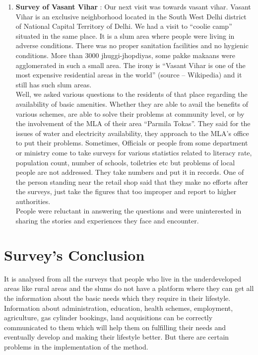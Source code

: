 \begin{enumerate}
\item \textbf{Survey of Vasant Vihar} : Our next visit was towards vasant vihar. Vasant Vihar is an exclusive neighborhood located in the South West Delhi district of National Capital Territory
of Delhi. We had a visit to “coolie camp” situated in the same place. It is a slum area
where people were living in adverse conditions. There was no proper sanitation
facilities and no hygienic conditions. More than 3000 jhuggi-jhopdiyas, some pakke
makaans were agglomerated in such a small area. The irony is “Vasant Vihar is one
of the most expensive residential areas in the world” (source – Wikipedia) and it
still has such slum areas.
\ \\
Well, we asked various questions to the residents of that place regarding the
availability of basic amenities. Whether they are able to avail the benefits of various
schemes, are able to solve their problems at community level, or by the involvement
of the MLA of their area “Parmila Tokas”. They said for the issues of water and
electricity availability, they approach to the MLA’s office to put their problems.
Sometimes, Officials or people from some department or ministry come to take
surveys for various statistics related to literacy rate, population count, number of
schools, toiletries etc but problems of local people are not addressed. They take
numbers and put it in records. One of the person standing near the retail shop said
that they make no efforts after the surveys, just take the figures that too improper
and report to higher authorities.
\ \\
People were reluctant in answering the questions and were uninterested in sharing
the stories and experiences they face and encounter.
\end{enumerate}

\newpage
\section{Survey's Conclusion}
It is analysed from all the surveys that people who live in the underdeveloped areas
like rural areas and the slums do not have a platform where they can get all the
information about the basic needs which they require in their lifestyle. Information
about administration, education, health schemes, employment, agriculture, gas
cylinder bookings, land acquisitions can be correctly communicated to them which
will help them on fulfilling their needs and eventually develop and making their
lifestyle better. But there are certain problems in the implementation of the
method.

